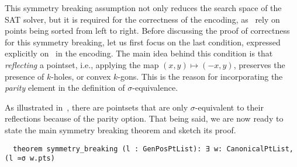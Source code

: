 This symmetry breaking assumption not only reduces the search space of the SAT solver, but it is required for the correctness of the encoding, as~ rely on points being sorted from left to right.
Before discussing the proof of correctness for this symmetry breaking, let us first focus on the last condition, expressed explicitly on~ in the encoding. The main idea behind this condition is that \emph{reflecting} a pointset, i.e., applying the map $(x, y) \mapsto (-x, y)$, preserves the presence of $k$-holes, or convex $k$-gons. This is the reason for incorporating the \emph{parity} element in the definition of $\sigma$-equivalence.

As illustrated in~, there are pointsets that are only $\sigma$-equivalent to their reflections because of the parity option. That being said, we are now ready to state the main symmetry breaking theorem and sketch its proof.



\begin{lstlisting}
  theorem symmetry_breaking (l : GenPosPtList): ∃ w: CanonicalPtList, (l ≃σ w.pts)
\end{lstlisting}


